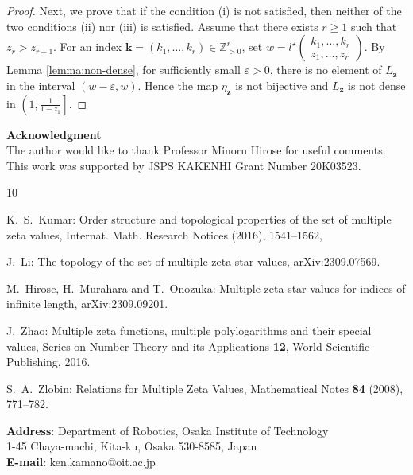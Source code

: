 \documentclass[12pt,a4paper]{article}
\theoremstyle{remark}
\begin{document}
\begin{proof}
Next, we prove that 
if the condition (i) is not satisfied,
then 
neither of the two conditions (ii) nor (iii) is satisfied.
Assume that there exists $r\ge 1$ 
such that $z_r>z_{r+1}$.
For an index $\boldsymbol{k}=(k_1,\ldots, k_r)\in\mathbb{Z}_{>0}^r$,
set $w=
l^{\star}\begin{pmatrix}
k_1,\ldots, k_r\\
z_1, \ldots , z_r
\end{pmatrix}$.
By Lemma \ref{lemma:non-dense},
for sufficiently small $\varepsilon>0$,
there is no element of $L_{\boldsymbol{z}}$
in the interval $(w-\varepsilon, w)$.
Hence the map $\eta_{\boldsymbol{z}}$
is not bijective and 
$L_{\boldsymbol{z}}$ is not dense in 
$\left( 1, \frac{1}{1-z_1} \right]$.

\end{proof}





\noindent \textbf{\large Acknowledgment}\\[5pt]
The author would like to thank Professor Minoru Hirose for useful comments. This work was supported by JSPS KAKENHI Grant Number 20K03523.
\vspace{10pt}


\begin{thebibliography}{10}

K.~S.~Kumar: Order structure and topological properties of the set
of multiple zeta values,
Internat. Math. Research Notices (2016), 1541--1562,

J.~Li: The topology of the set of multiple zeta-star values, arXiv:2309.07569.

M.~Hirose, H.~Murahara and T.~Onozuka:
Multiple zeta-star values for indices of infinite length, arXiv:2309.09201.

J.~Zhao: 
Multiple zeta functions, multiple polylogarithms and their special values,
Series on Number Theory and its Applications \textbf{12}, World Scientific Publishing, 2016.

S.~A.~Zlobin: 
Relations for Multiple Zeta Values,
Mathematical Notes \textbf{84} (2008), 771--782. 


\end{thebibliography}
\vspace{10pt}


\noindent \textbf{Address}: Department of Robotics, Osaka Institute of Technology\\
1-45 Chaya-machi, Kita-ku, Osaka 530-8585, Japan\\

\noindent \textbf{E-mail}: ken.kamano@oit.ac.jp
\end{document}
